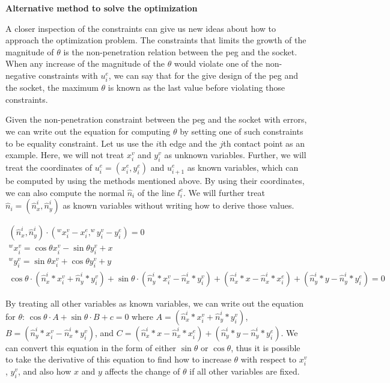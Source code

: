 \documentclass[11pt]{article}
\begin{document}
\noindent\textbf{Alternative method to solve the optimization}

A closer inspection of the constraints can give us new ideas about how to approach the optimization problem. The constraints that limits the growth of the magnitude of $\theta$ is the non-penetration relation between the peg and the socket. When any increase of the magnitude of the $\theta$ would violate one of the non-negative constraints with $u^e_i$, we can say that for the give design of the peg and the socket, the maximum $\theta$ is known as the last value before violating those constraints. 

Given the non-penetration constraint between the peg and the socket with errors, we can write out the equation for computing $\theta$ by setting one of such constraints to be equality constraint. Let us use the $i$th edge and the $j$th contact point as an example. Here, we will not treat $x^v_i$ and $y^v_i$ as unknown variables. Further, we will treat the coordinates of $u^e_i = (x^e_i, y^e_i)$ and $u^e_{i+1}$ as known variables, which can be computed by using the methods mentioned above. By using their coordinates, we can also compute the normal $\hat{n}_i$ of the line $l^e_i$. We will further treat $\hat{n}_i = (\hat{n}^i_x, \hat{n}^i_y)$ as known variables without writing how to derive those values. 

\begin{eqnarray}
(\hat{n}^i_x, \hat{n}^i_y)\cdot (^wx^v_i-x^e_i, ^wy^v_i-y^e_i) = 0\\
^wx^v_i = \cos\theta x^v_i - \sin\theta y^v_i + x\\
^wy^v_i = \sin\theta x^v_i + \cos\theta y^v_i + y\\
\cos\theta\cdot(\hat{n}^i_x*x^v_i+\hat{n}^i_y*y^v_i) + \sin\theta\cdot(\hat{n}^i_y*x^v_i-\hat{n}^i_x*y^v_i) + (\hat{n}^i_x*x-\hat{n}^i_x*x^e_i) + (\hat{n}^i_y*y  - \hat{n}^i_y * y^e_i) = 0
\end{eqnarray}

By treating all other variables as known variables, we can write out the equation for $\theta$: $\cos\theta\cdot A + \sin\theta\cdot B + c = 0$ where $A = (\hat{n}^i_x*x^v_i+\hat{n}^i_y*y^v_i)$, $B = (\hat{n}^i_y*x^v_i-\hat{n}^i_x*y^v_i)$, and $C = (\hat{n}^i_x*x-\hat{n}^i_x*x^e_i) + (\hat{n}^i_y*y  - \hat{n}^i_y * y^e_i)$. We can convert this equation in the form of either $\sin\theta$ or $\cos\theta$, thus it is possible to take the derivative of this equation to find how to increase $\theta$ with respect to $x^v_i$, $y^v_i$, and also how $x$ and $y$ affects the change of $\theta$ if all other variables are fixed. 
\end{document}
